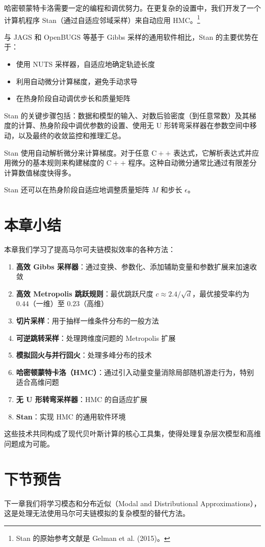 哈密顿蒙特卡洛需要一定的编程和调优努力。在更复杂的设置中，我们开发了一个计算机程序 Stan（通过自适应邻域采样）来自动应用 HMC。\footnote{Stan 的原始参考文献是 Gelman et al. (2015)。}

与 JAGS 和 OpenBUGS 等基于 Gibbs 采样的通用软件相比，Stan 的主要优势在于：
\begin{itemize}
  \item 使用 NUTS 采样器，自适应地确定轨迹长度
  \item 利用自动微分计算梯度，避免手动求导
  \item 在热身阶段自动调优步长和质量矩阵
\end{itemize}

Stan 的关键步骤包括：数据和模型的输入、对数后验密度（到任意常数）及其梯度的计算、热身阶段中调优参数的设置、使用无 U 形转弯采样器在参数空间中移动，以及最终的收敛监控和推理汇总。

Stan 使用自动解析微分来计算梯度。对于任意 $\mathrm{C}++$ 表达式，它解析表达式并应用微分的基本规则来构建梯度的 $\mathrm{C}++$ 程序。这种自动微分通常比通过有限差分计算数值梯度快得多。

Stan 还可以在热身阶段自适应地调整质量矩阵 $M$ 和步长 $\epsilon$。

\section{本章小结}

本章我们学习了提高马尔可夫链模拟效率的各种方法：

\begin{enumerate}
  \item \textbf{高效 Gibbs 采样器}：通过变换、参数化、添加辅助变量和参数扩展来加速收敛
  \item \textbf{高效 Metropolis 跳跃规则}：最优跳跃尺度 $c \approx 2.4 / \sqrt{d}$，最优接受率约为 $0.44$（一维）至 $0.23$（高维）
  \item \textbf{切片采样}：用于抽样一维条件分布的一般方法
  \item \textbf{可逆跳转采样}：处理跨维度问题的 Metropolis 扩展
  \item \textbf{模拟回火与并行回火}：处理多峰分布的技术
  \item \textbf{哈密顿蒙特卡洛（HMC）}：通过引入动量变量消除局部随机游走行为，特别适合高维问题
  \item \textbf{无 U 形转弯采样器}：HMC 的自适应扩展
  \item \textbf{Stan}：实现 HMC 的通用软件环境
\end{enumerate}

这些技术共同构成了现代贝叶斯计算的核心工具集，使得处理复杂层次模型和高维问题成为可能。

\section{下节预告}

下一章我们将学习模态和分布近似（Modal and Distributional Approximations），这是处理无法使用马尔可夫链模拟的复杂模型的替代方法。

\endinput
